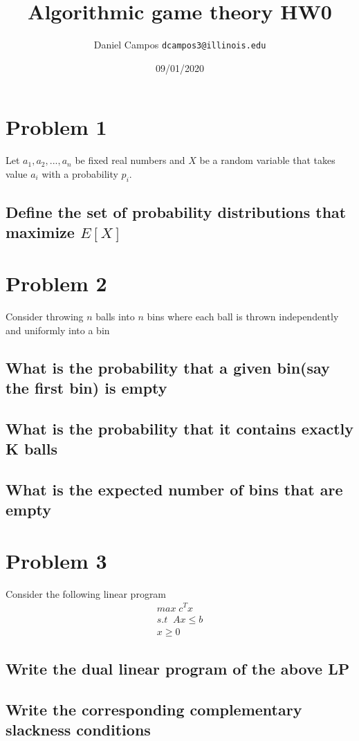 \documentclass[]{article}
\title{Algorithmic game theory HW0}
\author{Daniel Campos  \tt {dcampos3@illinois.edu}}
\date{09/01/2020}
\begin{document}
\maketitle

\section{Problem 1}
Let $a_1,a_2,...,a_n$ be fixed real numbers and $X$ be a random variable that takes value $a_i$ with a probability $p_i$. 
\subsection{Define the set of probability distributions that maximize $E[X]$}
\section{Problem 2}
Consider throwing $n$ balls into $n$ bins where each ball is thrown independently and uniformly into a bin
\subsection{What is the probability that a given bin(say the first bin) is empty}
\subsection{What is the probability that it contains exactly K balls}
\subsection{What is the expected number of bins that are empty}
\section{Problem 3}
Consider the following linear program \\

\begin{align}
max \; c^Tx \\
s.t \;\; Ax \leq b \\
x \geq 0
\end{align}

\subsection{Write the dual linear program of the above LP}
\subsection{Write the corresponding complementary slackness conditions}
\end{document}
